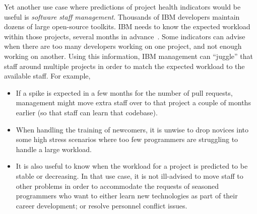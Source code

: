 \documentclass[smallextended]{svjour3}
\newcommand{\bi}{\begin{itemize}}
\newcommand{\ei}{\end{itemize}}
\begin{document}
Yet another use case where predictions of project health indicators would be useful is {\em software staff management}.
  Thousands of IBM developers maintain dozens of    large open-source toolkits. 
 IBM needs to know the expected workload within those projects, several months in advance~\cite{krishna2018connection}.
Some indicators can advise when  there are too many developers working on one project, and not enough working on another.
Using this information,
 IBM management  can    ``juggle'' that staff around multiple  projects in order to match the  expected workload to the available staff. 
 For example, 
 \bi
 \item
 If a spike is expected in a few months for the number of pull
 requests,    management might move extra staff over to that project a couple of months earlier (so that staff can learn that codebase). 
 \item When handling  the training of newcomers, it is unwise to drop novices into some high stress scenarios where too few programmers are struggling to handle a large workload.
 \item It is also useful to know when the workload for a project is predicted to be stable or decreasing. In that use case, it is not ill-advised to move staff to other problems in order to accommodate the requests of seasoned programmers who want to either learn new technologies as part of their career development; or resolve personnel conflict issues.
 \ei
 
\end{document}
